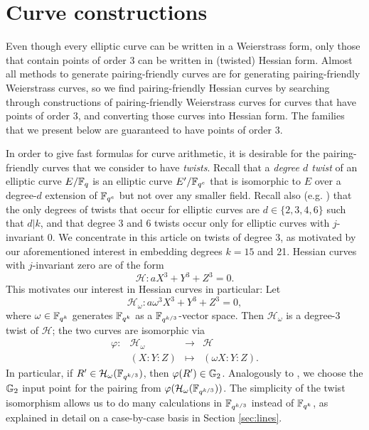 \section{Curve constructions}
\label{sec:curves}

Even though every elliptic curve can be written in a Weierstrass form,
only those that contain points of order 3 can be written in (twisted) Hessian form.
Almost all methods to generate pairing-friendly curves are for generating
pairing-friendly Weierstrass curves, 
so we find pairing-friendly Hessian curves by
searching through constructions of pairing-friendly Weierstrass curves for curves that have points of order 3,
and converting those curves into Hessian form.
The families that we present below are guaranteed to have points of order 3.

In order to give fast formulas for curve arithmetic, it is desirable for the pairing-friendly curves that we consider to have \emph{twists}. Recall that a \emph{degree $d$ twist} of an elliptic curve $E/\mathbb{F}_{q}$ is an elliptic curve $E'/\mathbb{F}_{q^e}$ that is
isomorphic to $E$ over a degree-$d$ extension of $\mathbb{F}_{q^e}$ but not over any smaller field.
Recall also (e.g. \cite{2009/silver-arithmetic}) that the only degrees of twists that occur for elliptic curves are $d \in \{2,3,4,6\}$ such that $d|k$, and that degree 3 and 6 twists occur only for elliptic curves with $j$-invariant 0.
We concentrate in this article on twists of degree 3, as motivated by our aforementioned interest in embedding degrees $k = 15$ and 21.
Hessian curves with $j$-invariant zero are of the form
\[\mathcal{H}: aX^3 + Y^3 + Z^3 = 0.\]
This motivates our interest in Hessian curves in particular:
Let
$$ \mathcal{H}_{\omega}: a \omega^3 X^3 + Y^3 + Z^3 = 0, $$
where $\omega \in \mathbb{F}_{q^k} $ generates $\mathbb{F}_{q^k}$ as a $\mathbb{F}_{q^{k/3}}$-vector space.
Then $\mathcal{H}_{\omega}$ is a degree-3 twist of $\mathcal{H}$; the two curves are isomorphic via
\begin{equation}\label{twistiso}
\begin{array}{rccc}
\varphi: & \mathcal{H}_{\omega} & \rightarrow & \mathcal{H} \\
& (X:Y:Z) & \mapsto & (\omega X:Y:Z).
\end{array}
\end{equation}
In particular, if $R' \in \mathcal{H}_{\omega}(\mathbb{F}_{q^{k/3}})$, then
$\varphi(R') \in \mathbb{G}_{2}$.
Analogously to \cite{??}, we choose the $\mathbb{G}_{2}$ input point for the pairing
from $\varphi(\mathcal{H}_{\omega}(\mathbb{F}_{q^{k/3}}))$.
The simplicity of the twist isomorphism 
allows us to do many calculations in $\mathbb{F}_{q^{k/3}}$ instead of $\mathbb{F}_{q^k}$,
as explained in detail on a case-by-case basis in Section \ref{sec:lines}.

